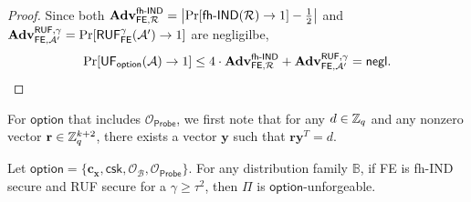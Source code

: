 \begin{proof}
\noindent Since both $\mathbf{Adv}_{\textsf{FE}, \mathcal{R}}^\textsf{fh-IND} = \left| \Pr[\textsf{fh-IND}(\mathcal{R}) \to 1] - \frac{1}{2} \right|$ and $\mathbf{Adv}_{\textsf{FE}, \mathcal{A}^\prime}^{\textsf{RUF}, \gamma} = \Pr[\textsf{RUF}^\gamma_{\textsf{FE}}(\mathcal{A}^\prime) \to 1 ]$ are negligilbe,
\[
	\Pr[\textsf{UF}_\textsf{option}(\mathcal{A}) \to 1] \leq 4 \cdot \mathbf{Adv}_{\textsf{FE}, \mathcal{R}}^\textsf{fh-IND} + \mathbf{Adv}_{\textsf{FE}, \mathcal{A}^\prime}^{\textsf{RUF}, \gamma} = \mathsf{negl}.
\]

\end{proof}


For $\textsf{option}$ that includes $\mathcal{O}_{\textsf{Probe}}$, we first note that for any $d \in \mathbb{Z}_q$ and any nonzero vector $\mathbf{r} \in \mathbb{Z}_q^{k+2}$, there exists a vector $\mathbf{y}$ such that $\mathbf{r}\mathbf{y}^T = d$.

\begin{theorem}
\label{thm:ind-uf-OB-Probe}

Let $\textsf{option} = \{\mathbf{c_x}, \textsf{csk}, \mathcal{O}_\mathcal{B}, \mathcal{O}_\textsf{Probe}\}$. For any distribution family $\mathbb{B}$, if \textsf{FE} is fh-IND secure and RUF secure for a $\gamma \geq \tau^2$, then $\Pi$ is $\textsf{option}$-unforgeable. 
\end{theorem}


